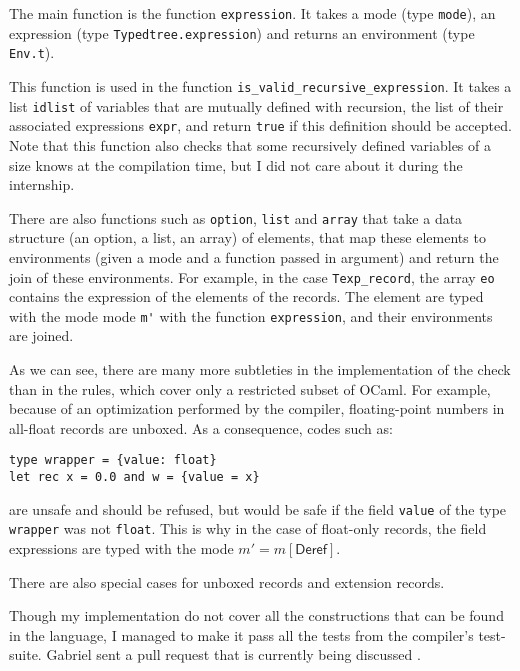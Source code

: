 \documentclass{article}
\newcommand{\Deref}{\mathsf{Deref}}
\begin{document}
The main function is the function \lstinline|expression|. It takes a mode (type
\lstinline|mode|), an expression (type \lstinline|Typedtree.expression|) and
returns an environment (type \lstinline|Env.t|).

This function is used in the function \lstinline|is_valid_recursive_expression|.
It takes a list \lstinline|idlist| of variables that are mutually defined with
recursion, the list of their associated expressions \lstinline|expr|, and
return \lstinline|true| if this definition should be accepted. Note that this
function also checks that some recursively defined variables of a size knows at
the compilation time, but I did not care about it during the internship.

There are also functions such as \lstinline|option|, \lstinline|list| and
\lstinline|array| that take a data structure (an option, a list, an array) of
elements, that map these elements to environments (given a mode and a function
passed in argument) and return the join of these environments. For example, in
the case \lstinline|Texp_record|, the array \lstinline|eo| contains the
expression of the elements of the records. The element are typed with the mode
mode \lstinline|m'| with the function \lstinline|expression|, and their
environments are joined.

As we can see, there are many more subtleties in the implementation of the
check than in the rules, which cover only a restricted subset of OCaml. For
example, because of an optimization performed by the compiler, floating-point
numbers in all-float records are unboxed. As a consequence, codes such as:
\begin{lstlisting}
type wrapper = {value: float}
let rec x = 0.0 and w = {value = x}
\end{lstlisting}
are unsafe and should be refused, but would be safe if the field
\lstinline|value| of the type \lstinline|wrapper| was not \lstinline|float|.
This is why in the case of float-only records, the field expressions are typed
with the mode $m' = m[\Deref]$.

There are also special cases for unboxed records and extension records.

Though my implementation do not cover all the constructions that can be found in
the language, I managed to make it pass all the tests from the compiler's
test-suite. Gabriel sent a pull request that is currently being discussed
\cite{NewSystemPullRequest}.
\end{document}
